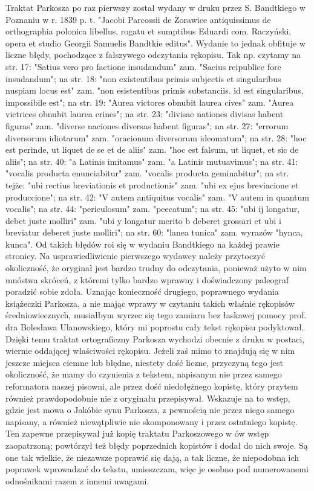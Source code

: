 Traktat Parkosza po raz pierwszy został wydany w druku przez S. Bandtkiego w Poznaniu w r. 1839 p. t. "Jacobi Parcossii de Żorawice antiquissimus de orthographia polonica libellus, rogatu et sumptibus Eduardi com. Raczyński, opera et studio Georgii Samuelis Bandtkie editus". Wydanie to jednak obfituje w liczne błędy, pochodzące z fałszywego odczytania rękopisu. Tak np. czytamy na str. 17: "Satius vero pro factione insudandum" zam. "Sacius reipublice fore insudandum"; na str. 18: "non existentibus primis subjectis et singularibus nuspiam locus est" zam. "non esistentibus primis substanciis. id est singularibus, impossibile est"; na str. 19: "Aurea victores obnubit laurea cives" zam. "Aurea victrices obnubit laurea crines"; na str. 23: "divisae nationes divisas habent figuras" zam. "diverse naciones diversas habent figuras"; na str. 27: "errorum diversorum idiotarum" zam. "oracionum diversorum ideomatum"; na str. 28: "hoc est perinde, ut liquet de se et de aliis" zam. "hoc est falsum, ut liquet, et sic de aliis"; na str. 40: "a Latinis imitamus" zam. "a Latinis mutuavimus"; na str. 41: "vocalis producta enunciabitur" zam. "vocalis producta geminabitur"; na str. tejże: "ubi rectius breviationis et productionis" zam. "ubi ex ejus breviacione et produccione"; na str. 42: "V autem antiquitus vocalis" zam. "V autem in quantum vocalis"; na str. 44: "periculosum" zam. "peecatum"; na str. 45: "ubi ij longatur, debet juste molliri" zam. "ubi y longatur merito b deberet grossari et ubi i breviatur deberet juste molliri"; na str. 60: "lanea tunica" zam. wyrazów "hynca, kunca". Od takich błędów roi się w wydaniu Bandtkiego na każdej prawie stronicy. Na usprawiedliwienie pierwszego wydawcy należy przytoczyć okoliczność, że oryginał jest bardzo trudny do odczytania, ponieważ użyto w nim mnóstwa skróceń, z któremi tylko bardzo wprawny i doświadczony paleograf poradzić sobie zdoła. Uznając konieczność drugiego, poprawnego wydania książeczki Parkosza, a nie mając wprawy w czytaniu takich właśnie rękopisów średniowiecznych, musiałbym wyrzec się tego zamiaru bez łaskawej pomocy prof. dra Bolesława Ulanowskiego, który mi poprostu cały tekst rękopisu podyktował. Dzięki temu traktat ortograficzny Parkosza wychodzi obecnie z druku w postaci, wiernie oddającej właściwości rękopisu. Jeżeli zaś mimo to znajdują się w nim jeszcze miejsca ciemne lub błędne, niestety dość liczne, przyczyną tego jest okoliczność, że mamy do czynienia z tekstem, napisanym nie przez samego reformatora naszej pisowni, ale przez dość niedołężnego kopistę, który przytem również prawdopodobnie nie z oryginału przepisywał. Wskazuje na to wstęp, gdzie jest mowa o Jakóbie synu Parkosza, z pewnością nie przez niego samego napisany, a również niewątpliwie nie skomponowany i przez ostatniego kopistę. Ten zapewne przepisywał już kopię traktatu Parkoszowego w ów wstęp zaopatrzoną; powtórzył też błędy poprzednich kopistów i dodał do nich swoje. Są one tak wielkie, że niezawsze poprawić się dają, a tak liczne, że niepodobna ich poprawek wprowadzać do tekstu, umieszczam, więc je osobno pod numerowanemi odnośnikami razem z innemi uwagami.

